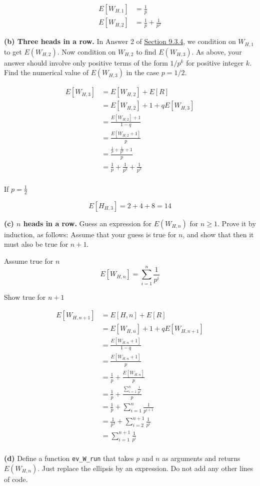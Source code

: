 \documentclass{report}
\begin{document}
\begin{align*}
	E[W_{H,1}] &= \frac{1}{p} \\
	E[W_{H,2}] &= \frac{1}{p} + \frac{1}{p^{2}}
\end{align*}



\textbf{(b) Three heads in a row.} In Answer 2 of
\href{https://data140.org/textbook/content/chapter-09/expected-waiting-times/\#waiting-till-hh}{Section
9.3.4}, we condition on \(W_{H,1}\) to get \(E(W_{H,2})\). Now condition
on \(W_{H,2}\) to find \(E(W_{H,3})\). As above, your answer should
involve only positive terms of the form \(1/p^k\) for positive integer
\(k\). Find the numerical value of \(E(W_{H,3})\) in the case
\(p = 1/2\).


\begin{align*}
	E[W_{H,3}] &= E[W_{H,2}] + E[R] \\
	 &= E[W_{H,2}] + 1 + qE[W_{H,3}]\\
	 &= \frac{E[W_{H,2}] + 1}{1-q} \\
	 &= \frac{E[W_{H,2} +1]}{p} \\
	 &= \frac{\frac{1}{p} + \frac{1}{p^{2}}+1}{p} \\
	 &= \frac{1}{p} + \frac{1}{p^{2}} + \frac{1}{p^{3}} \\
\end{align*}


If $ p=\frac{1}{2} $ 

\[
E[H_{H,3}] = 2 + 4 + 8 = 14
\]




\textbf{(c) \(n\) heads in a row.} Guess an expression for
\(E(W_{H,n})\) for \(n \ge 1\). Prove it by induction, as follows:
Assume that your guess is true for \(n\), and show that then it must
also be true for \(n+1\).


Assume true for $ n $   
\[
E[W_{H,n}] = \sum_{i=1}^{n} \frac{1}{p^{i}}
\]

Show true for $ n+1 $ 

\begin{align*}
	E[W_{H,n+1}]&= E[H, n] + E[R] \\
	&= E[W_{H,n}] + 1 + qE[W_{H,n+1}] \\
	&= \frac{E[W_{H,n} + 1]}{1-q} \\
	&= \frac{E[W_{H,n} + 1]}{p} \\
	&= \frac{1}{p} + \frac{E[W_{H,n}]}{p} \\
	&= \frac{1}{p} + \frac{\sum_{i=1}^{n} \frac{1}{p^{i}}}{p} \\
	&= \frac{1}{p} + \sum_{i=1}^{n} \frac{1}{p^{i+1}} \\
	&= \frac{1}{p^{1}} + \sum_{i=2}^{n+1} \frac{1}{p^{i}} \\
	&=\boxed{ \sum_{i=1}^{n+1} \frac{1}{p^{i}} } \\
\end{align*}


\textbf{(d)} Define a function \texttt{ev\_W\_run} that takes \(p\) and
\(n\) as arguments and returns \(E(W_{H,n})\). Just replace the ellipsis
by an expression. Do not add any other lines of code.
\end{document}

